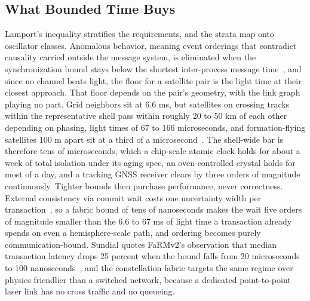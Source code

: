\documentclass[twocolumn,10pt]{article}
\begin{document}
\subsection{What Bounded Time Buys}\label{sec:buys}
Lamport's inequality stratifies the requirements, and the strata map onto oscillator classes. Anomalous behavior, meaning event orderings that contradict causality carried outside the message system, is eliminated when the synchronization bound stays below the shortest inter-process message time~\cite{lamport1978}, and since no channel beats light, the floor for a satellite pair is the light time at their closest approach. That floor depends on the pair's geometry, with the link graph playing no part. Grid neighbors sit at 6.6 ms, but satellites on crossing tracks within the representative shell pass within roughly 20 to 50 km of each other depending on phasing, light times of 67 to 166 microseconds, and formation-flying satellites 100 m apart sit at a third of a microsecond~\cite{suncatcher2025}. The shell-wide bar is therefore tens of microseconds, which a chip-scale atomic clock holds for about a week of total isolation under its aging spec, an oven-controlled crystal holds for most of a day, and a tracking GNSS receiver clears by three orders of magnitude continuously. Tighter bounds then purchase performance, never correctness. External consistency via commit wait costs one uncertainty width per transaction~\cite{corbett2012}, so a fabric bound of tens of nanoseconds makes the wait five orders of magnitude smaller than the 6.6 to 67 ms of light time a transaction already spends on even a hemisphere-scale path, and ordering becomes purely communication-bound. Sundial quotes FaRMv2's observation that median transaction latency drops 25 percent when the bound falls from 20 microseconds to 100 nanoseconds~\cite{li2020}, and the constellation fabric targets the same regime over physics friendlier than a switched network, because a dedicated point-to-point laser link has no cross traffic and no queueing.
\end{document}
